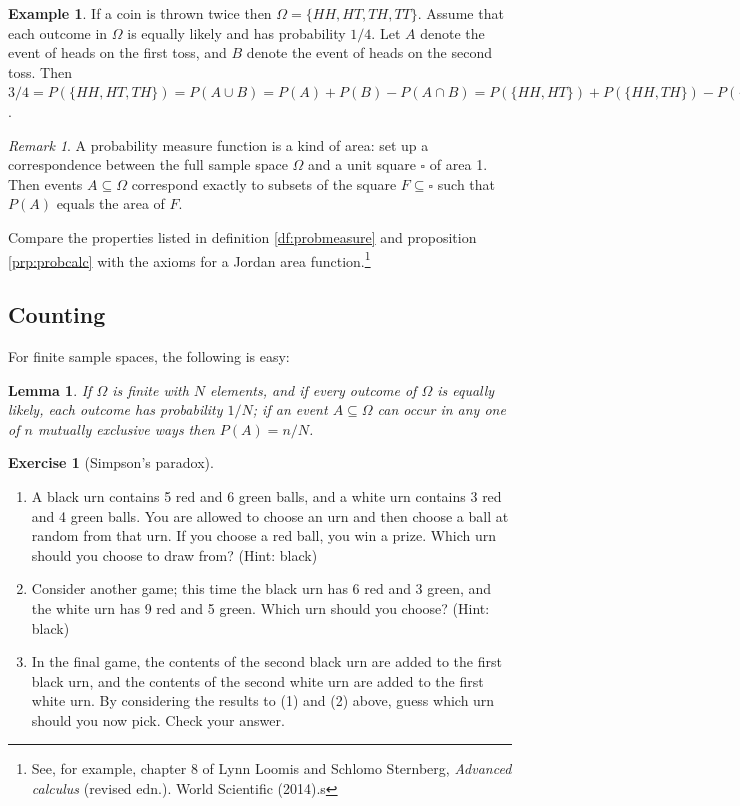 \documentclass[a4paper,leqno]{article}
\numberwithin{equation}{section}
\newtheorem{lem}[equation]{Lemma}
\theoremstyle{definition}
\newtheorem{ex}[equation]{Example}
\newtheorem{exercise}[equation]{Exercise}
\theoremstyle{remark}
\newtheorem{rem}[equation]{Remark}
\newcommand{\union}{\cup}
\newcommand{\inter}{\cap}
\begin{document}
\begin{ex}
  If a coin is thrown twice then $ \Omega = \{HH,HT,TH,TT\} $. Assume that each outcome in $ \Omega $ is equally likely and
  has probability $ 1/4 $. Let $ A $ denote the event of heads on the first toss, and $ B $ denote the event of heads on the
  second toss. Then $ 3/4 = P(\{HH,HT,TH\}) = P(A \union B) = P(A) + P(B) - P(A \inter B) = P(\{HH,HT\}) + P(\{HH,TH\}) - P(\{HH\}) = 3/4 $.
\end{ex}

\begin{rem}
  A probability measure function is a kind of area: set up a correspondence between the full sample
  space $ \Omega $ and a unit square $ \square $ of area 1. Then events $ A \subseteq \Omega $ correspond exactly
  to subsets of the square $ F \subseteq \square $ such that $ P(A) $ equals the area of $ F $.

  Compare the properties listed in definition \ref{df:probmeasure} and proposition \ref{prp:probcalc} with
  the axioms for a Jordan area function.\footnote{See, for example, chapter 8 of Lynn Loomis and Schlomo
  Sternberg, \emph{Advanced calculus} (revised edn.). World Scientific (2014).s}
\end{rem}

\subsection{Counting}
For finite sample spaces, the following is easy:
\begin{lem}
  If $ \Omega $ is finite with $ N $ elements, and if every outcome of $ \Omega $ is equally likely, each outcome
  has probability $ 1/N $; if an event $ A \subseteq \Omega $ can occur in any one of $ n $ mutually exclusive ways
  then $ P(A) = n/N $.
\end{lem}

\begin{exercise}[Simpson's paradox]\leavevmode
  \begin{enumerate}
    \item A black urn contains 5 red and 6 green balls, and a white urn contains 3 red and 4 green balls. You are allowed
          to choose an urn and then choose a ball at random from that urn. If you choose a red ball, you win a prize. Which urn
          should you choose to draw from? (Hint: black)
    \item Consider another game; this time the black urn has 6 red and 3 green, and the white urn has 9 red and 5 green. Which
          urn should you choose? (Hint: black)
    \item In the final game, the contents of the second black urn are added to the first black urn, and the contents of the second
          white urn are added to the first white urn. By considering the results to (1) and (2) above, guess which urn should you now pick. Check your answer.
  \end{enumerate}
\end{exercise}
\end{document}
